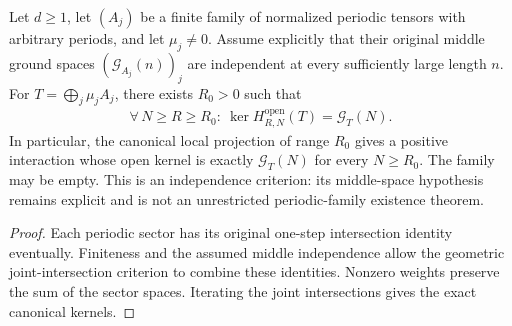 \begin{lemma}
    \label{thm:periodic_family_interaction_independence_criterion}
    \leanok
    Let $d\ge1$, let $(A_j)$ be a finite family of normalized periodic
    tensors with arbitrary periods, and let $\mu_j\ne0$.
    Assume explicitly that their original middle ground spaces
    $(\mathcal G_{A_j}(n))_j$ are independent at every sufficiently large
    length $n$. For $T=\bigoplus_j\mu_jA_j$, there exists $R_0>0$ such that
    \begin{align}
        \forall\,N\ge R\ge R_0:\ \ker H_{R,N}^{\mathrm{open}}(T)=\mathcal G_T(N).
    \end{align}
    In particular, the canonical local projection of range $R_0$ gives a
    positive interaction whose open kernel is exactly $\mathcal G_T(N)$
    for every $N\ge R_0$. The family may be empty.
    This is an independence criterion: its middle-space hypothesis remains
    explicit and is not an unrestricted periodic-family existence theorem.
\end{lemma}
\begin{proof}\leanok
    Each periodic sector has its original one-step intersection identity
    eventually. Finiteness and the assumed middle independence allow the
    geometric joint-intersection criterion to combine these identities.
    Nonzero weights preserve the sum of the sector spaces. Iterating the
    joint intersections gives the exact canonical kernels.
\end{proof}

